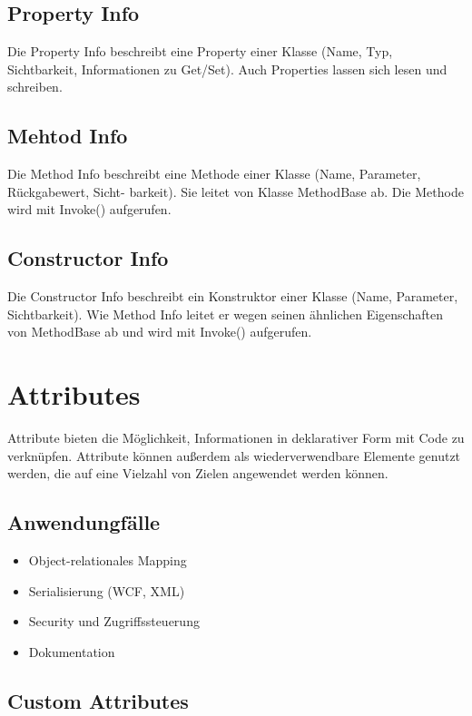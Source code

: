 \subsection{Property Info}
Die Property Info beschreibt eine Property einer Klasse (Name, Typ, Sichtbarkeit, Informationen zu Get/Set). Auch Properties lassen sich lesen und schreiben.

\subsection{Mehtod Info}
Die Method Info beschreibt eine Methode einer Klasse (Name, Parameter, Rückgabewert, Sicht- barkeit). Sie leitet von Klasse MethodBase ab. Die Methode wird mit Invoke() aufgerufen.

\subsection{Constructor Info}
Die Constructor Info beschreibt ein Konstruktor einer Klasse (Name, Parameter, Sichtbarkeit). Wie Method Info leitet er wegen seinen ähnlichen Eigenschaften von MethodBase ab und wird mit Invoke() aufgerufen.


\section{Attributes}
Attribute bieten die Möglichkeit, Informationen in deklarativer Form mit Code zu verknüpfen. Attribute können außerdem als wiederverwendbare Elemente genutzt werden, die auf eine Vielzahl von Zielen angewendet werden können.

\subsection{Anwendungfälle}
\begin{itemize}
  \itemsep -0.5em 
  \item Object-relationales Mapping
  \item Serialisierung (WCF, XML)
  \item Security und Zugriffssteuerung
  \item Dokumentation
\end{itemize}

\subsection{Custom Attributes}


